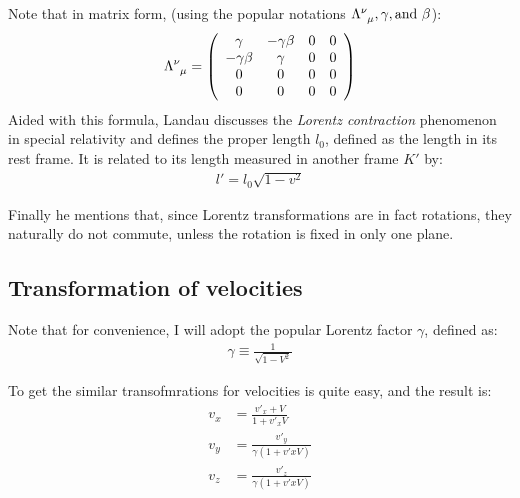 \documentclass{article}
\numberwithin{equation}{subsection} %
\theoremstyle{definition}
\begin{document}
    Note that in matrix form, (using the popular notations
    $\tensor[]{\Lambda}{^\nu_\mu},\gamma, \text{and }\beta$):
    \begin{align}
        \tensor[]{\Lambda}{^\nu_\mu} =
        \left( \begin{array}{cccc}
         \gamma        & -\gamma \beta & 0 & 0 \\
         -\gamma \beta & \gamma        & 0 & 0 \\
         0             & 0             & 0 & 0 \\
         0             & 0             & 0 & 0 \\
        \end{array} \right)
    \end{align}
    Aided with this formula, Landau discusses the \textit{Lorentz
    contraction} phenomenon in special relativity and defines
    the proper length
    $l_0$, defined as the length in its rest frame. It is related
    to its length measured in another frame $K'$ by:
    \begin{align}
        l' = l_0 \sqrt{1-v^2}
    \end{align}

    Finally he mentions that, since Lorentz transformations are
    in fact rotations, they naturally do not commute, unless the
    rotation is fixed in only one plane.

    \subsection{Transformation of velocities}
    \label{sec:Transformation_of_velocities}
    
    Note that for convenience, I will adopt the popular Lorentz factor
    $\gamma$, defined as:
    \begin{align}
        \gamma \equiv \frac{1}{\sqrt{1-V^2}}
    \end{align}

    To get the similar transofmrations for velocities is quite easy,
    and the result is:
    \begin{align}
        v_x &= \frac{v'_x + V}{1+ v'_x V}\\
        v_y &= \frac{v'_y}{\gamma \left(1+v'x V\right)}\\
        v_z &= \frac{v'_z}{\gamma \left(1+v'x V\right)}\\
    \end{align}
\end{document}
